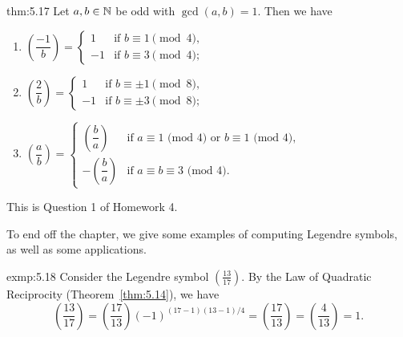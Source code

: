 \begin{theo}{thm:5.17}
    Let $a, b \in \mathbb{N}$ be odd with $\gcd(a, b) = 1$. Then we have 
    \begin{enumerate}[(1)]
        \item $\left( \dfrac{-1}{b} \right) = \begin{cases} 
            1 & \text{if } b \equiv 1 \pmod 4, \\ 
            -1 & \text{if } b \equiv 3 \pmod 4; 
        \end{cases}$ 
        \item $\left( \dfrac{2}{b} \right) = \begin{cases} 
            1 & \text{if } b \equiv \pm1 \pmod 8, \\ 
            -1 & \text{if } b \equiv \pm3 \pmod 8; 
        \end{cases}$
        \item $\left( \dfrac{a}{b} \right) = \begin{cases}
            \left(\dfrac ba \right) & \text{if $a \equiv 1$ (mod $4$) or $b \equiv 1$ (mod $4$),} \\[2ex]
            -\left(\dfrac ba \right) & \text{if $a \equiv b \equiv 3$ (mod $4$).} 
        \end{cases}$
    \end{enumerate}
\end{theo}
\begin{pf}
    This is Question 1 of Homework 4.
\end{pf}

To end off the chapter, we give some examples of computing Legendre symbols, 
as well as some applications. 

\begin{exmp}{exmp:5.18}
    Consider the Legendre symbol $(\frac{13}{17})$. By the Law of Quadratic 
    Reciprocity (Theorem~\ref{thm:5.14}), we have 
    \[ \left( \frac{13}{17} \right) = \left( \frac{17}{13} \right) 
    (-1)^{(17-1)(13-1)/4} = \left( \frac{17}{13} \right) 
    = \left( \frac{4}{13} \right) = 1. \] 
\end{exmp}

